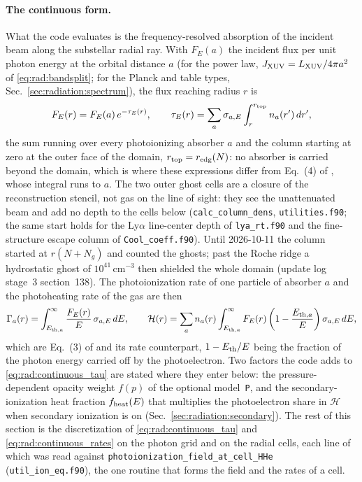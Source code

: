 \paragraph{The continuous form.} What the code evaluates is the
frequency-resolved absorption of the incident beam along the substellar
radial ray. With $F_E(a)$ the incident flux per unit photon energy at the
orbital distance $a$ (for the power law, $J_{\rm XUV} = L_{\rm XUV}/4\pi a^{2}$
of \eqref{eq:rad:bandsplit}; for the Planck and table types,
Sec.~\ref{sec:radiation:spectrum}), the flux reaching radius $r$ is
\begin{equation}
F_E(r) = F_E(a)\,e^{-\tau_E(r)},
\qquad
\tau_E(r) = \sum_a \sigma_{a,E}\int_r^{r_{\rm top}} n_a(r')\,dr',
\label{eq:rad:continuous_tau}
\end{equation}
the sum running over every photoionizing absorber $a$ and the column
starting at zero at the outer face of the domain, $r_{\rm top} = r_{\rm
edg}(N)$: no absorber is carried beyond the domain, which is where these
expressions differ from Eq.~(4) of \citet{Caldiroli2021}, whose integral runs
to $a$. The two outer ghost cells are a closure of the reconstruction
stencil, not gas on the line of sight: they see the unattenuated beam and add
no depth to the cells below (\texttt{calc\_column\_dens},
\texttt{utilities.f90}; the same start holds for the Ly$\alpha$ line-center
depth of \texttt{lya\_rt.f90} and the fine-structure escape column of
\texttt{Cool\_coeff.f90}). Until 2026-10-11 the column started at
$r(N+N_g)$ and counted the ghosts; past the Roche ridge a hydrostatic ghost
of $10^{41}$\,cm$^{-3}$ then shielded the whole domain (update log stage~3
section~138).
The photoionization rate of one particle of absorber $a$ and the
photoheating rate of the gas are then
\begin{equation}
\Gamma_a(r) = \int_{E_{{\rm th},a}}^{\infty}
   \frac{F_E(r)}{E}\,\sigma_{a,E}\,dE,
\qquad
\mathcal{H}(r) = \sum_a n_a(r)\int_{E_{{\rm th},a}}^{\infty}
   F_E(r)\left(1-\frac{E_{{\rm th},a}}{E}\right)\sigma_{a,E}\,dE,
\label{eq:rad:continuous_rates}
\end{equation}
which are Eq.~(3) of \citet{Caldiroli2021} and its rate counterpart,
$1-E_{\rm th}/E$ being the fraction of the photon energy carried off by the
photoelectron. Two factors the code adds to \eqref{eq:rad:continuous_tau}
are stated where they enter below: the pressure-dependent opacity weight
$f(p)$ of the optional model~\texttt{P}, and the secondary-ionization heat
fraction $f_{\rm heat}(E)$ that multiplies the photoelectron share in
$\mathcal{H}$ when secondary ionization is on
(Sec.~\ref{sec:radiation:secondary}). The rest of this section is the
discretization of \eqref{eq:rad:continuous_tau} and
\eqref{eq:rad:continuous_rates} on the photon grid and on the radial cells,
each line of which was read against \texttt{photoionization\_field\_at\_cell\_HHe}
(\texttt{util\_ion\_eq.f90}), the one routine that forms the field and the
rates of a cell.

